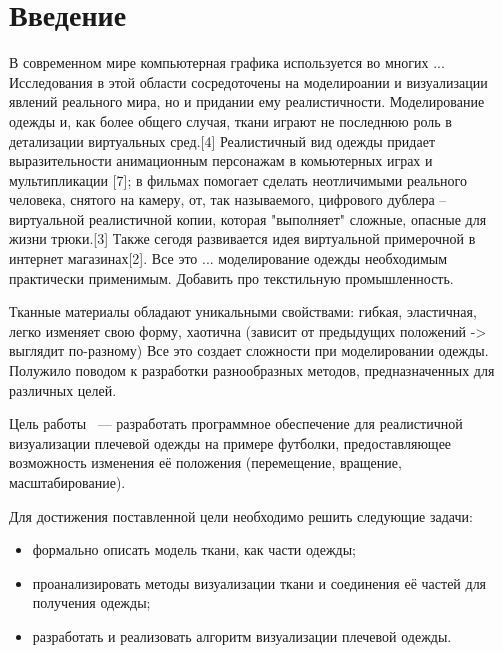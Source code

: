 \chapter*{Введение}

В современном мире компьютерная графика используется во многих ... Исследования
в этой области сосредоточены на моделироании и визуализации явлений реального
мира, но и придании ему реалистичности. Моделирование одежды и, как более
общего случая, ткани играют не последнюю роль в детализации виртуальных
сред.[4] Реалистичный вид одежды придает выразительности анимационным
персонажам в комьютерных играх и мультипликации [7]; в фильмах помогает сделать
неотличимыми реального человека, снятого на камеру, от, так называемого,
цифрового дублера -- виртуальной реалистичной копии, которая "выполняет"
сложные,  опасные для жизни трюки.[3] Также сегодя развивается идея виртуальной
примерочной в интернет магазинах[2]. Все это ... моделирование одежды
необходимым практически применимым.  Добавить про текстильную промышленность.

Тканные материалы обладают уникальными свойствами: гибкая, эластичная, легко
изменяет свою форму, хаотична (зависит от предыдущих положений -> выглядит
по-разному) Все это создает сложности при моделировании одежды. Полужило
поводом к разработки разнообразных методов, предназначенных для различных
целей.

Цель работы ~--- разработать программное обеспечение для реалистичной
визуализации плечевой одежды на примере футболки, предоставляющее возможность
изменения её положения (перемещение, вращение, масштабирование).

Для достижения поставленной цели необходимо решить следующие задачи:
\begin{itemize}[left=\parindent] \item  формально описать модель ткани, как
            части одежды; \item  проанализировать методы визуализации ткани и
            соединения её частей для получения одежды; \item  разработать и
                реализовать алгоритм визуализации плечевой одежды.
\end{itemize}

% 
% 
